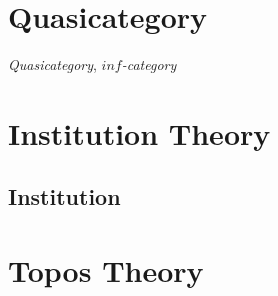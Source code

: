 \section{Quasicategory}\label{sec:quasicategory}

\emph{Quasicategory}, \emph{$inf$-category}



\section{Institution Theory}\label{sec:institution_theory}

\subsection{Institution}\label{sec:institution}



\section{Topos Theory}\label{sec:topos_theory}
